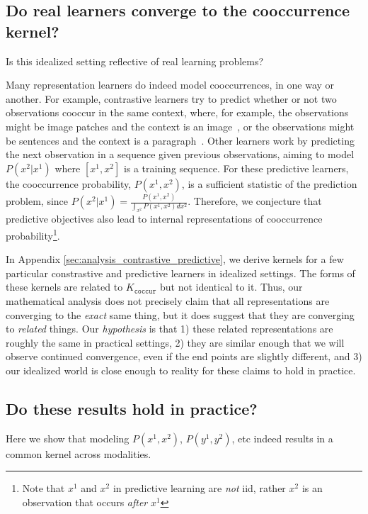 \subsection{Do real learners converge to the cooccurrence kernel?}
Is this idealized setting reflective of real learning problems? 

Many representation learners do indeed model cooccurrences, in one way or another. For example, contrastive learners try to predict whether or not two observations cooccur in the same context, where, for example, the observations might be image patches and the context is an image~\cite{SimCLR}, or the observations might be sentences and the context is a paragraph~\cite{SimSCE}. Other learners work by predicting the next observation in a sequence given previous observations, aiming to model $P(x^2 | x^1)$ where $[x^1, x^2]$ is a training sequence. For these predictive learners, the cooccurrence probability, $P(x^1, x^2)$, is a sufficient statistic of the prediction problem, since $P(x^2 | x^1) = \frac{P(x^1, x^2)}{\int_{x^2} P(x^1, x^2) dx^2}$. Therefore, we conjecture that predictive objectives also lead to internal representations of cooccurrence probability\footnote{Note that $x^1$ and $x^2$ in predictive learning are \textit{not} iid, rather $x^2$ is an observation that occurs \textit{after} $x^1$}.

In Appendix \ref{sec:analysis_contrastive_predictive}, we derive kernels for a few particular constrastive and predictive learners in idealized settings. The forms of these kernels are related to $K_{\texttt{coccur}}$ but not identical to it. Thus, our mathematical analysis does not precisely claim that all representations are converging to the \textit{exact} same thing, but it does suggest that they are converging to \textit{related} things. Our \textit{hypothesis} is that 1) these related representations are roughly the same in practical settings, 2) they are similar enough that we will observe continued convergence, even if the end points are slightly different, and 3) our idealized world is close enough to reality for these claims to hold in practice.


\subsection{Do these results hold in practice?}
Here we show that modeling $P(x^1, x^2)$, $P(y^1, y^2)$, etc indeed results in a common kernel across modalities.

